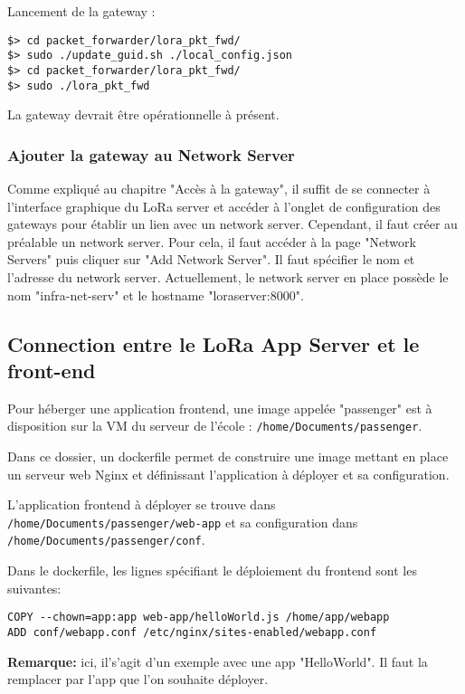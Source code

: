 Lancement de la gateway : 
\begin{verbatim}
$> cd packet_forwarder/lora_pkt_fwd/
$> sudo ./update_guid.sh ./local_config.json
$> cd packet_forwarder/lora_pkt_fwd/
$> sudo ./lora_pkt_fwd
\end{verbatim}

La gateway devrait être opérationnelle à présent.

\subsubsection{Ajouter la gateway au Network Server}

Comme expliqué au chapitre "Accès à la gateway", il suffit de se connecter à l'interface graphique du LoRa server et accéder à l'onglet de configuration des gateways pour établir un lien avec un network server. Cependant, il faut créer au préalable un network server. Pour cela, il faut accéder à la page "Network Servers" puis cliquer sur "Add Network Server". Il faut spécifier le nom et l'adresse du network server. Actuellement, le network server en place possède le nom "infra-net-serv" et le hostname "loraserver:8000".

\subsection{Connection entre le LoRa App Server et le front-end}

Pour héberger une application frontend, une image appelée "passenger" est à disposition sur la VM du serveur de l'école : \texttt{/home/Documents/passenger}.

Dans ce dossier, un dockerfile permet de construire une image mettant en place un serveur web Nginx et définissant l'application à déployer et sa configuration.

L'application frontend à déployer se trouve dans \texttt{/home/Documents/passenger/web-app} et sa configuration dans \texttt{/home/Documents/passenger/conf}.

Dans le dockerfile, les lignes spécifiant le déploiement du frontend sont les suivantes:

\begin{verbatim}
COPY --chown=app:app web-app/helloWorld.js /home/app/webapp
ADD conf/webapp.conf /etc/nginx/sites-enabled/webapp.conf
\end{verbatim}

\textbf{Remarque:} ici, il's'agit d'un exemple avec une app "HelloWorld". Il faut la remplacer par l'app que l'on souhaite déployer.

